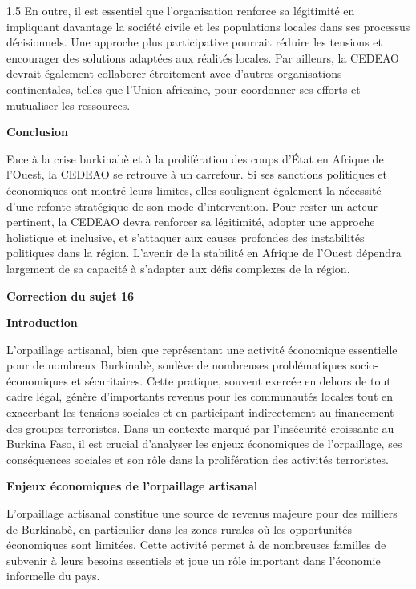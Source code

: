 \documentclass[12pt]{article}
\begin{document}
\begin{spacing}{1.5}
En outre, il est essentiel que l’organisation renforce sa légitimité en impliquant davantage la société civile et les populations locales dans ses processus décisionnels. Une approche plus participative pourrait réduire les tensions et encourager des solutions adaptées aux réalités locales. Par ailleurs, la CEDEAO devrait également collaborer étroitement avec d’autres organisations continentales, telles que l’Union africaine, pour coordonner ses efforts et mutualiser les ressources.

\quad

\textbf{Conclusion}

Face à la crise burkinabè et à la prolifération des coups d’État en Afrique de l’Ouest, la CEDEAO se retrouve à un carrefour. Si ses sanctions politiques et économiques ont montré leurs limites, elles soulignent également la nécessité d’une refonte stratégique de son mode d’intervention. Pour rester un acteur pertinent, la CEDEAO devra renforcer sa légitimité, adopter une approche holistique et inclusive, et s’attaquer aux causes profondes des instabilités politiques dans la région. L’avenir de la stabilité en Afrique de l’Ouest dépendra largement de sa capacité à s’adapter aux défis complexes de la région.



\quad

\textbf{Correction du sujet 16}



\quad

\textbf{Introduction}

L'orpaillage artisanal, bien que représentant une activité économique essentielle pour de nombreux Burkinabè, soulève de nombreuses problématiques socio-économiques et sécuritaires. Cette pratique, souvent exercée en dehors de tout cadre légal, génère d'importants revenus pour les communautés locales tout en exacerbant les tensions sociales et en participant indirectement au financement des groupes terroristes. Dans un contexte marqué par l'insécurité croissante au Burkina Faso, il est crucial d'analyser les enjeux économiques de l'orpaillage, ses conséquences sociales et son rôle dans la prolifération des activités terroristes.

\quad

\textbf{Enjeux économiques de l'orpaillage artisanal}

L'orpaillage artisanal constitue une source de revenus majeure pour des milliers de Burkinabè, en particulier dans les zones rurales où les opportunités économiques sont limitées. Cette activité permet à de nombreuses familles de subvenir à leurs besoins essentiels et joue un rôle important dans l'économie informelle du pays.


\end{spacing}
\end{document}
